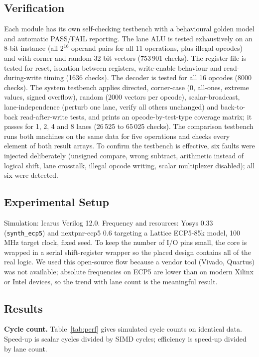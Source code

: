 \documentclass[conference]{IEEEtran}
\begin{document}
\subsection{Verification}
Each module has its own self-checking testbench with a behavioural golden model and automatic PASS/FAIL reporting. The lane ALU is tested exhaustively on an 8-bit instance (all $2^{16}$ operand pairs for all 11 operations, plus illegal opcodes) and with corner and random 32-bit vectors (753\,901 checks). The register file is tested for reset, isolation between registers, write-enable behaviour and read-during-write timing (1636 checks). The decoder is tested for all 16 opcodes (8000 checks). The system testbench applies directed, corner-case (0, all-ones, extreme values, signed overflow), random (2000 vectors per opcode), scalar-broadcast, lane-independence (perturb one lane, verify all others unchanged) and back-to-back read-after-write tests, and prints an opcode-by-test-type coverage matrix; it passes for 1, 2, 4 and 8 lanes (26\,525 to 65\,025 checks). The comparison testbench runs both machines on the same data for five operations and checks every element of both result arrays. To confirm the testbench is effective, six faults were injected deliberately (unsigned compare, wrong subtract, arithmetic instead of logical shift, lane crosstalk, illegal opcode writing, scalar multiplexer disabled); all six were detected.

\subsection{Experimental Setup}
Simulation: Icarus Verilog 12.0. Frequency and resources: Yosys 0.33 (\texttt{synth\_ecp5}) and nextpnr-ecp5 0.6 targeting a Lattice ECP5-85k model, 100\,MHz target clock, fixed seed. To keep the number of I/O pins small, the core is wrapped in a serial shift-register wrapper so the placed design contains all of the real logic. We used this open-source flow because a vendor tool (Vivado, Quartus) was not available; absolute frequencies on ECP5 are lower than on modern Xilinx or Intel devices, so the trend with lane count is the meaningful result.

\subsection{Results}
\textbf{Cycle count.} Table~\ref{tab:perf} gives simulated cycle counts on identical data. Speed-up is scalar cycles divided by SIMD cycles; efficiency is speed-up divided by lane count.
\end{document}
